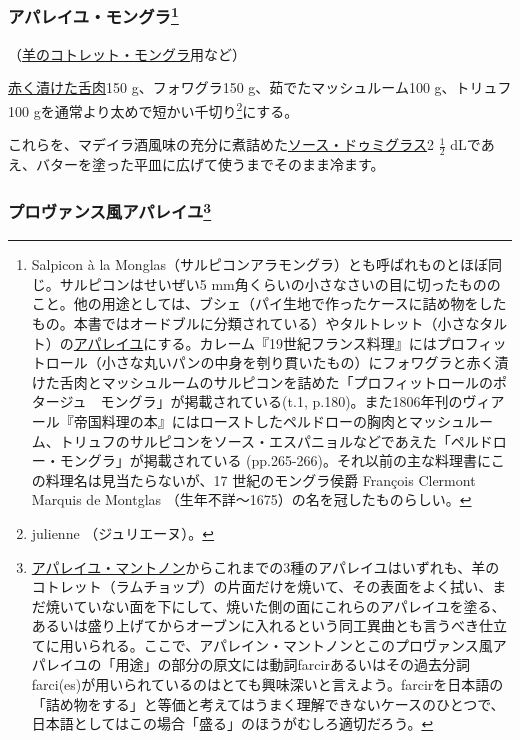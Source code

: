 \begin{recette}
{\subsubsection[アパレイユ・モングラ]{\texorpdfstring{アパレイユ・モングラ\footnote{Salpicon
  à la
  Monglas（サルピコンアラモングラ）とも呼ばれものとほぼ同じ。サルピコンはせいぜい5
  mm角くらいの小さなさいの目に切ったもののこと。他の用途としては、ブシェ（パイ生地で作ったケースに詰め物をしたもの。本書ではオードブルに分類されている）やタルトレット（小さなタルト）の\ul{アパレイユ}にする。カレーム『19世紀フランス料理』にはプロフィットロール（小さな丸いパンの中身を刳り貫いたもの）にフォワグラと赤く漬けた舌肉とマッシュルームのサルピコンを詰めた「プロフィットロールのポタージュ　モングラ」が掲載されている(t.1,
  p.180)。また1806年刊のヴィアール『帝国料理の本』にはローストしたペルドローの胸肉とマッシュルーム、トリュフのサルピコンをソース・エスパニョルなどであえた「ペルドロー・モングラ」が掲載されている
  (pp.265-266)。それ以前の主な料理書にこの料理名は見当たらないが、17
  世紀のモングラ侯爵 François Clermont Marquis de Montglas
  （生年不詳〜1675）の名を冠したものらしい。}}{アパレイユ・モングラ}}\label{appareil-montglas}}



（\protect\hyperlink{cotelettes-monglas}{羊のコトレット・モングラ}用など）

\protect\hyperlink{saumure-liquide-pour-langues}{赤く漬けた舌肉}150
g、フォワグラ150 g、茹でたマッシュルーム100 g、トリュフ100
gを通常より太めで短かい千切り\footnote{julienne （ジュリエーヌ）。}にする。

これらを、マデイラ酒風味の充分に煮詰めた\protect\hyperlink{sauce-demi-glace}{ソース・ドゥミグラス}2
\(\frac{1}{2}\)
dLであえ、バターを塗った平皿に広げて使うまでそのまま冷ます。

\atoaki{}

\hypertarget{appareil-provencal}{%
\subsubsection[プロヴァンス風アパレイユ]{\texorpdfstring{プロヴァンス風アパレイユ\footnote{\protect\hyperlink{appareil-maintenon}{アパレイユ・マントノン}からこれまでの3種のアパレイユはいずれも、羊のコトレット（ラムチョップ）の片面だけを焼いて、その表面をよく拭い、まだ焼いていない面を下にして、焼いた側の面にこれらのアパレイユを塗る、あるいは盛り上げてからオーブンに入れるという同工異曲とも言うべき仕立てに用いられる。ここで、アパレイン・マントノンとこのプロヴァンス風アパレイユの「用途」の部分の原文には動詞farcirあるいはその過去分詞farci(es)が用いられているのはとても興味深いと言えよう。farcirを日本語の「詰め物をする」と等価と考えてはうまく理解できないケースのひとつで、日本語としてはこの場合「盛る」のほうがむしろ適切だろう。}}{プロヴァンス風アパレイユ}}\label{appareil-provencal}}


\end{recette}
